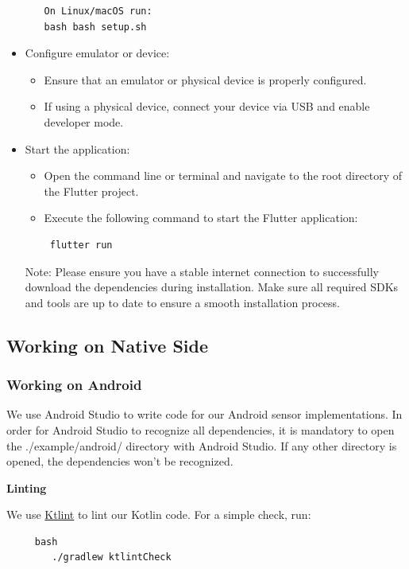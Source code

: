 \documentclass[12pt]{article}
\begin{document}
\begin{itemize}
\begin{itemize}
\begin{verbatim}
On Linux/macOS run:
bash bash setup.sh        
\end{verbatim}        
        \end{itemize}
    \item Configure emulator or device:
        \begin{itemize}
        \item Ensure that an emulator or physical device is properly configured.
        \item If using a physical device, connect your device via USB and enable developer mode.
        \end{itemize}
    \item Start the application:
        \begin{itemize}
        \item Open the command line or terminal and navigate to the root directory of the Flutter project.
        \item Execute the following command to start the Flutter application:
\begin{verbatim}
 flutter run
\end{verbatim}        
        \end{itemize}

\begin{tiny}
Note: Please ensure you have a stable internet connection to successfully download the dependencies during installation. 
Make sure all required SDKs and tools are up to date to ensure a smooth installation process.
\end{tiny}        

\end{itemize}

\subsection{Working on Native Side}
    \subsubsection{Working on Android}
    We use Android Studio to write code for our Android sensor implementations. In order for Android Studio to recognize all dependencies, it is mandatory to open the ./example/android/ directory with Android Studio. If any other directory is opened, the dependencies won't be recognized.
    
    \textbf{Linting}

    We use \href{https://pinterest.github.io/ktlint/}{Ktlint} to lint our Kotlin code.
    For a simple check, run:
    \begin{verbatim}
     bash
        ./gradlew ktlintCheck
    \end{verbatim}    
    
\end{document}
